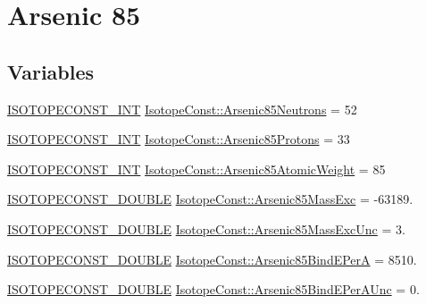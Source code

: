 \hypertarget{group___isotope_const-_arsenic-_as85}{}\section{Arsenic 85}
\label{group___isotope_const-_arsenic-_as85}
\subsection*{Variables}
\begin{DoxyCompactItemize}
\item 
\mbox{\hyperlink{group___isotope_const-_macros_ga5f18360b3e99483a35c32d789e62621c}{I\+S\+O\+T\+O\+P\+E\+C\+O\+N\+S\+T\+\_\+\+I\+NT}} \mbox{\hyperlink{group___isotope_const-_arsenic-_as85_gabf99f319752a6f71d2244fd2bcc91172}{Isotope\+Const\+::\+Arsenic85\+Neutrons}} = 52
\item 
\mbox{\hyperlink{group___isotope_const-_macros_ga5f18360b3e99483a35c32d789e62621c}{I\+S\+O\+T\+O\+P\+E\+C\+O\+N\+S\+T\+\_\+\+I\+NT}} \mbox{\hyperlink{group___isotope_const-_arsenic-_as85_ga63ec13397f0bd9fcf4fbee03e6190282}{Isotope\+Const\+::\+Arsenic85\+Protons}} = 33
\item 
\mbox{\hyperlink{group___isotope_const-_macros_ga5f18360b3e99483a35c32d789e62621c}{I\+S\+O\+T\+O\+P\+E\+C\+O\+N\+S\+T\+\_\+\+I\+NT}} \mbox{\hyperlink{group___isotope_const-_arsenic-_as85_ga73e5cdf1f1b55a7d05e574c6922d224d}{Isotope\+Const\+::\+Arsenic85\+Atomic\+Weight}} = 85
\item 
\mbox{\hyperlink{group___isotope_const-_macros_ga8f45a7272ce02c0b4c65c44636ed719a}{I\+S\+O\+T\+O\+P\+E\+C\+O\+N\+S\+T\+\_\+\+D\+O\+U\+B\+LE}} \mbox{\hyperlink{group___isotope_const-_arsenic-_as85_gae268e3bc227dbf53f69a84d17dd1ee1d}{Isotope\+Const\+::\+Arsenic85\+Mass\+Exc}} = -\/63189.
\item 
\mbox{\hyperlink{group___isotope_const-_macros_ga8f45a7272ce02c0b4c65c44636ed719a}{I\+S\+O\+T\+O\+P\+E\+C\+O\+N\+S\+T\+\_\+\+D\+O\+U\+B\+LE}} \mbox{\hyperlink{group___isotope_const-_arsenic-_as85_ga624ae886a2f8f5b98096cbac9d4886dc}{Isotope\+Const\+::\+Arsenic85\+Mass\+Exc\+Unc}} = 3.
\item 
\mbox{\hyperlink{group___isotope_const-_macros_ga8f45a7272ce02c0b4c65c44636ed719a}{I\+S\+O\+T\+O\+P\+E\+C\+O\+N\+S\+T\+\_\+\+D\+O\+U\+B\+LE}} \mbox{\hyperlink{group___isotope_const-_arsenic-_as85_gab3f93f86fb2429561887e42fb7740333}{Isotope\+Const\+::\+Arsenic85\+Bind\+E\+PerA}} = 8510.
\item 
\mbox{\hyperlink{group___isotope_const-_macros_ga8f45a7272ce02c0b4c65c44636ed719a}{I\+S\+O\+T\+O\+P\+E\+C\+O\+N\+S\+T\+\_\+\+D\+O\+U\+B\+LE}} \mbox{\hyperlink{group___isotope_const-_arsenic-_as85_ga2802000d5c1053367ffce776bf83dde8}{Isotope\+Const\+::\+Arsenic85\+Bind\+E\+Per\+A\+Unc}} = 0.

\end{DoxyCompactItemize}
